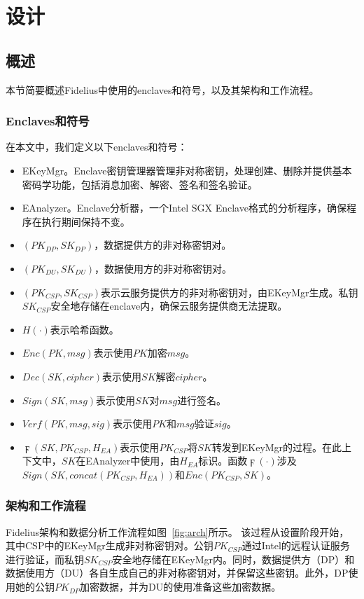 \section{设计}\label{sec:design}

\subsection{概述}
本节简要概述Fidelius中使用的enclaves和符号，以及其架构和工作流程。


\subsubsection{Enclaves和符号}
在本文中，我们定义以下enclaves和符号：
\begin{itemize}
    \item EKeyMgr。Enclave密钥管理器管理非对称密钥，处理创建、删除并提供基本密码学功能，包括消息加密、解密、签名和签名验证。
    \item EAnalyzer。Enclave分析器，一个Intel SGX Enclave格式的分析程序，确保程序在执行期间保持不变。
    \item $(PK_{DP},SK_{DP})$，数据提供方的非对称密钥对。
    \item $(PK_{DU},SK_{DU})$，数据使用方的非对称密钥对。
    \item $(PK_{CSP}, SK_{CSP})$表示云服务提供方的非对称密钥对，由EKeyMgr生成。私钥$SK_{CSP}$安全地存储在enclave内，确保云服务提供商无法提取。
    \item $H(\cdot)$表示哈希函数。
    \item $Enc(PK, msg)$表示使用$PK$加密$msg$。
    \item $Dec(SK, cipher)$表示使用$SK$解密$cipher$。
    \item $Sign(SK, msg)$表示使用$SK$对$msg$进行签名。
    \item $Verf(PK, msg, sig)$表示使用$PK$和$msg$验证$sig$。
    \item $\digamma(SK, PK_{CSP}, H_{EA})$表示使用$PK_{CSP}$将$SK$转发到EKeyMgr的过程。在此上下文中，$SK$在EAnalyzer中使用，由$H_{EA}$标识。函数$\digamma(\cdot)$涉及$Sign(SK, concat(PK_{CSP}, H_{EA}))$和$Enc(PK_{CSP}, SK)$。
\end{itemize}

\subsubsection{架构和工作流程}

Fidelius架构和数据分析工作流程如图~\ref{fig:arch}所示。
该过程从设置阶段开始，其中CSP中的EKeyMgr生成非对称密钥对。公钥$PK_{CSP}$通过Intel的远程认证服务进行验证，而私钥$SK_{CSP}$安全地存储在EKeyMgr内。同时，数据提供方（DP）和数据使用方（DU）各自生成自己的非对称密钥对，并保留这些密钥。此外，DP使用她的公钥$PK_{DP}$加密数据，并为DU的使用准备这些加密数据。

